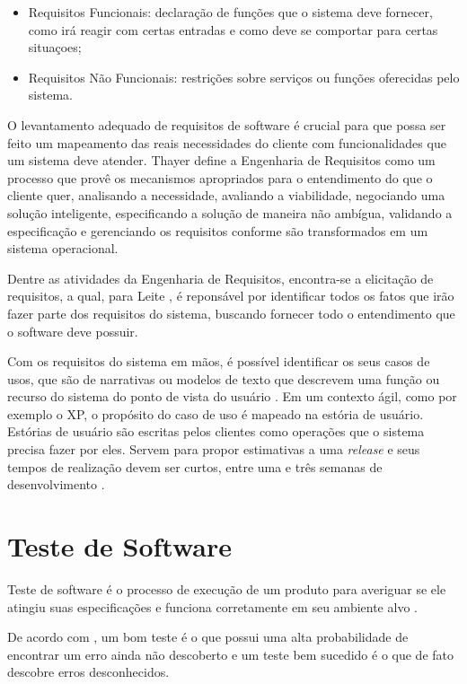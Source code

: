 \begin{itemize}
    \item Requisitos Funcionais: declaração de funções que o sistema deve fornecer, como irá reagir com certas entradas e como deve se comportar para certas situaçoes;
    \item Requisitos Não Funcionais: restrições sobre serviços ou funções oferecidas pelo sistema.
\end{itemize}

O levantamento adequado de requisitos de software é crucial para que possa ser feito um mapeamento das reais necessidades do cliente com funcionalidades que um sistema deve atender. Thayer \cite{thayer_1997} define a Engenharia de Requisitos como um processo que provê os mecanismos apropriados para o entendimento do que o cliente quer, analisando a necessidade, avaliando a viabilidade, negociando uma solução inteligente, especificando a solução de maneira não ambígua, validando a especificação e gerenciando os requisitos conforme são transformados em um sistema operacional.

Dentre as atividades da Engenharia de Requisitos, encontra-se a elicitação de requisitos, a qual, para Leite \cite{leite_1994}, é reponsável por identificar todos os fatos que irão fazer parte dos requisitos do sistema, buscando fornecer todo o entendimento que o software deve possuir.

Com os requisitos do sistema em mãos, é possível identificar os seus casos de usos, que são de narrativas ou modelos de texto que descrevem uma função ou recurso do sistema do ponto de vista do usuário \cite{pressman_2009}. Em um contexto ágil, como por exemplo o XP, o propósito do caso de uso é mapeado na estória de usuário. Estórias de usuário são escritas pelos clientes como operações que o sistema precisa fazer por eles. Servem para propor estimativas a uma \textit{release} e seus tempos de realização devem ser curtos, entre uma e três semanas de desenvolvimento \cite{beck_2004}.

\section{Teste de Software}
Teste de software é o processo de execução de um produto para averiguar se ele atingiu suas especificações e funciona corretamente em seu ambiente alvo \cite{artigo_intro_teste}.

De acordo com , um bom teste é o que possui uma alta probabilidade de encontrar um erro ainda não descoberto e um teste bem sucedido é o que de fato descobre erros desconhecidos.

